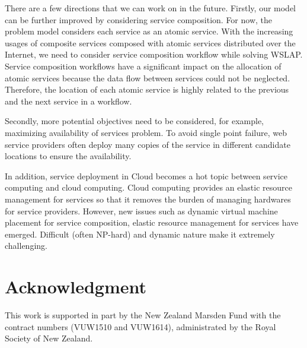 \documentclass[10pt,journal,compsoc]{IEEEtran}
\begin{document}

There are a few directions that we can work on in the future. Firstly, our model can be further improved by considering service composition. For now, the problem model considers each service as an atomic service. With the increasing usages of composite services composed with atomic services distributed over the Internet, we need to consider service composition workflow while solving WSLAP.   Service composition workflows have a significant impact on the allocation of atomic services because the data flow between services could not be neglected. Therefore, the location of each atomic service is highly related to the previous and the next service in a workflow.

Secondly, more potential objectives need to be considered, for example, maximizing availability of services problem. To avoid single point failure, web service providers often deploy many copies of the service in different candidate locations to ensure the availability. 

In addition, service deployment in Cloud becomes a hot topic between service computing and cloud computing. Cloud computing provides an elastic resource management for services so that it removes the burden of managing hardwares for service providers. However, new issues such as dynamic virtual machine placement for service composition, elastic resource management for services have emerged. Difficult (often NP-hard) and dynamic nature make it extremely challenging.




\section*{Acknowledgment}
This work is supported in part by the New Zealand Marsden Fund with the contract numbers (VUW1510 and VUW1614), administrated by the Royal Society of New Zealand.
\end{document}
